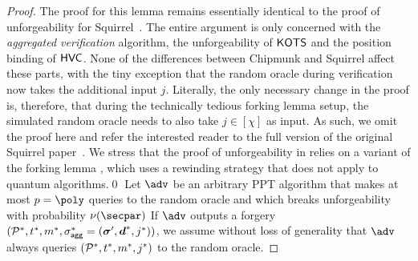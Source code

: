 \begin{proof}
  The proof for this lemma remains essentially identical to the proof of unforgeability for Squirrel~\cite{CCS:FleSimZha22}.
  The entire argument is only concerned with the \emph{aggregated verification} algorithm, the unforgeability of $\mathsf{KOTS}$ and the position binding of $\mathsf{HVC}$.
  None of the differences between Chipmunk and Squirrel affect these parts, with the tiny exception that the random oracle during verification now takes the additional input $j$.
  Literally, the only necessary change in the proof is, therefore, that during the technically tedious forking lemma setup, the simulated random oracle needs to also take $j\in[\chi]$ as input.
  As such, we omit the proof here and refer the interested reader to the full version of the original Squirrel paper~\cite{EPRINT:FleSimZha22}.
  We stress that the proof of unforgeability in \cite{EPRINT:FleSimZha22} relies on a variant \cite{CCS:BelNev06} of the forking lemma \cite{EC:PoiSte96}, which uses a rewinding strategy that does not apply to quantum algorithms.\qed
  \iffalse
  Let $\adv$ be an arbitrary PPT algorithm that makes at most $p=\poly$ queries to the random oracle and which breaks unforgeability with probability $\nu(\secpar)$
  If $\adv$ outputs a forgery $(\mathcal{P}^*,t^*,m^*,\sigma_\mathsf{agg}^*=(\boldsymbol{\sigma}',\boldsymbol{d}^*,j^*))$, we assume without loss of generality that $\adv$ always queries $(\mathcal{P}^*,t^*,m^*,j^*)$ to the random oracle.
  

\end{proof}

